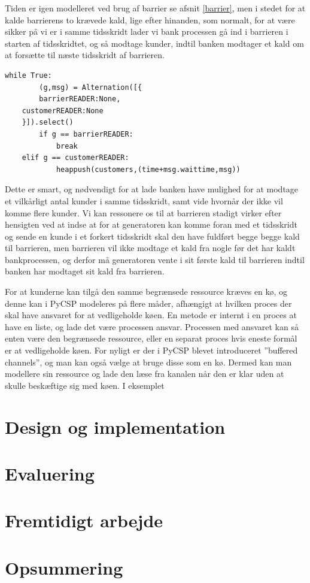 Tiden er igen modelleret ved brug af barrier se afsnit \vref{barrier}, men 
i stedet for  at kalde barrierens to krævede kald, lige efter hinanden, som 
normalt, for at være sikker på vi er i samme tidsskridt lader vi bank
processen gå ind i barrieren i starten af tidsskridtet, og så modtage kunder, 
indtil banken modtager et kald om at forsætte til næste tidsskridt af 
barrieren.
\begin{lstlisting}[float,label=bank-alternation-imp,caption=Modtage en kunde eller 
	barrier i Bankprocessen]
while True:
		(g,msg) = Alternation([{
		barrierREADER:None,
    customerREADER:None
    }]).select()
		if g == barrierREADER:
			break
    elif g == customerREADER:
			heappush(customers,(time+msg.waittime,msg))
\end{lstlisting}
Dette er smart, og nødvendigt for at lade banken have mulighed for at modtage 
et vilkårligt antal kunder i samme tidsskridt, samt vide hvornår der ikke vil  
komme flere kunder. Vi kan ressonere os til at barrieren stadigt virker efter 
hensigten ved at indse at for at generatoren kan komme foran med et tidsskridt og sende en 
kunde i et forkert tidsskridt skal den have fuldført begge begge kald til barrieren, men 
barrieren vil ikke modtage et kald fra nogle før det har kaldt bankprocessen, 
og derfor må generatoren vente i sit første kald til barrieren indtil banken har 
modtaget sit kald fra barrieren. 

For at kunderne kan tilgå den samme begrænsede ressource kræves en kø, og denne kan i PyCSP modeleres på flere måder, afhængigt at hvilken proces der skal have ansvaret for at vedligeholde køen. En metode er internt i en proces at have en liste, og lade det være processen ansvar. Processen med ansvaret kan så enten være den begrænsede ressource, eller en separat proces hvis eneste formål er at vedligeholde køen. For nyligt er der i PyCSP blevet introduceret ''buffered channels'', og man kan også vælge at bruge disse som en kø. Dermed kan man modellere sin ressource og lade den læse fra kanalen når den er klar uden at skulle beskæftige sig med køen. I eksemplet 
  \section{Design og implementation}
    
  \section{Evaluering}
  \section{Fremtidigt arbejde}
  \section{Opsummering}
